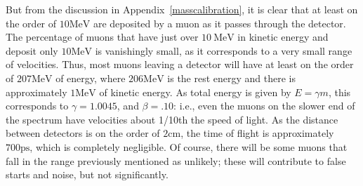 But from the discussion in Appendix~\ref{masscalibration}, it is clear that at least on the order of $10 \mathrm{MeV}$ are deposited by a muon as it passes through the detector. The percentage of muons that have just over $10~\mathrm{MeV}$ in kinetic energy and deposit only $10 \mathrm{MeV}$ is vanishingly small, as it corresponds to a very small range of velocities. Thus, most muons leaving a detector will have at least on the order of $207 \mathrm{MeV}$ of energy, where $206 \mathrm{MeV}$ is the rest energy and there is approximately $1 \mathrm{MeV}$ of kinetic energy. As total energy is given by $E = \gamma m$, this corresponds to $\gamma = 1.0045$, and $\beta = .10$: i.e., even the muons on the slower end of the spectrum have velocities about 1/10th the speed of light. As the distance between detectors is on the order of $2 \mathrm{cm}$, the time of flight is approximately $700 \mathrm{ps}$, which is completely negligible. Of course, there will be some muons that fall in the range previously mentioned as unlikely; these will contribute to false starts and noise, but not significantly. 